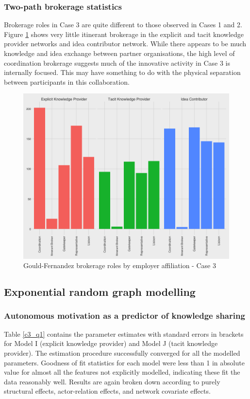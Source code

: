 \subsubsection{Two-path brokerage statistics}

Brokerage roles in Case 3 are quite different to those observed in Cases 1 and 2. Figure \ref{fig:gfbrokeragecase3} shows very little itinerant brokerage in the explicit and tacit knowledge provider networks and idea contributor network. While there appears to be much knowledge and idea exchange between partner organisations, the high level of coordination brokerage suggests much of the innovative activity in Case 3 is internally focused. This may have something to do with the physical separation between participants in this collaboration.\medskip 


\begin{figure}
	\centering
	\includegraphics[width=0.7\linewidth]{Images/gf_brokerage_case3}
	\caption{Gould-Fernandez brokerage roles by employer affiliation - Case 3}
	\label{fig:gfbrokeragecase3}
\end{figure}





\subsection{Exponential random graph modelling}

\subsubsection{Autonomous motivation as a predictor of knowledge sharing}

Table \ref{c3_q1} contains the parameter estimates with standard errors in brackets for Model I (explicit knowledge provider) and Model J (tacit knowledge provider). The estimation procedure successfully converged for all the modelled parameters. Goodness of fit statistics for each model were less than 1 in absolute value for almost all the features not explicitly modelled, indicating these fit the data reasonably well. Results are again broken down according to purely structural effects, actor-relation effects, and network covariate effects. \medskip

